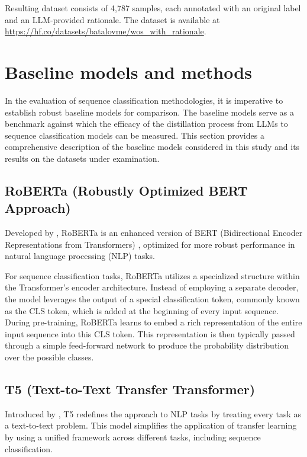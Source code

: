 Resulting dataset consists of 4,787 samples, each annotated with an original label and an LLM-provided rationale. The dataset is available at \linebreak \url{https://hf.co/datasets/batalovme/wos_with_rationale}.

\section{Baseline models and methods}
\label{sec:baselines}

In the evaluation of sequence classification methodologies, it is imperative to establish robust baseline models for comparison. The baseline models serve as a benchmark against which the efficacy of the distillation process from LLMs to sequence classification models can be measured. This section provides a comprehensive description of the baseline models considered in this study and its results on the datasets under examination.

\subsection{RoBERTa (Robustly Optimized BERT Approach)}

Developed by \citeauthor{roberta} \cite{roberta}, RoBERTa is an enhanced version of BERT (Bidirectional Encoder Representations from Transformers) \cite{bert}, optimized for more robust performance in natural language processing (NLP) tasks.

For sequence classification tasks, RoBERTa utilizes a specialized structure within the Transformer's encoder architecture. Instead of employing a separate decoder, the model leverages the output of a special classification token, commonly known as the CLS token, which is added at the beginning of every input sequence. During pre-training, RoBERTa learns to embed a rich representation of the entire input sequence into this CLS token. This representation is then typically passed through a simple feed-forward network to produce the probability distribution over the possible classes.

\subsection{T5 (Text-to-Text Transfer Transformer)}

Introduced by \citeauthor{t5} \cite{t5}, T5 redefines the approach to NLP tasks by treating every task as a text-to-text problem. This model simplifies the application of transfer learning by using a unified framework across different tasks, including sequence classification.

